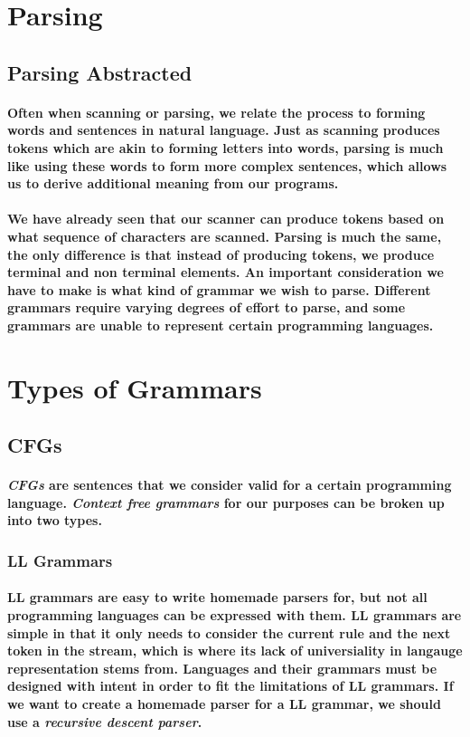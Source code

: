 \documentclass{article}
\begin{document}
\section{Parsing}
\subsection{Parsing Abstracted}
\paragraph{
    Often when scanning or parsing, we relate the process to forming words and
    sentences in natural language. Just as scanning produces tokens which are
    akin to forming letters into words, parsing is much like using these words
    to form more complex sentences, which allows us to derive additional meaning
    from our programs.
}
\paragraph{
    We have already seen that our scanner can produce tokens based on what
    sequence of characters are scanned. Parsing is much the same, the only
    difference is that instead of producing tokens, we produce terminal and
    non terminal elements. An important consideration we have to make is what
    kind of grammar we wish to parse. Different grammars require varying 
    degrees of effort to parse, and some grammars are unable to represent
    certain programming languages.
}


\section{Types of Grammars}
\subsection{CFGs}
\paragraph{
    \emph{CFGs} are sentences that we consider valid for a certain programming
    language. \emph{Context free grammars} for our purposes can be broken up
    into two types. 
}
\subsubsection{LL Grammars}
\paragraph{
    LL grammars are easy to write homemade parsers for, but not all programming
    languages can be expressed with them. LL grammars are simple in that it only
    needs to consider the current rule and the next token in the stream, which
    is where its lack of universiality in langauge representation stems from.
    Languages and their grammars must be designed with intent in order to fit 
    the limitations of LL grammars. If we want to create a homemade parser for 
    a LL grammar, we should use a \emph{recursive descent parser}.
}
\end{document}
